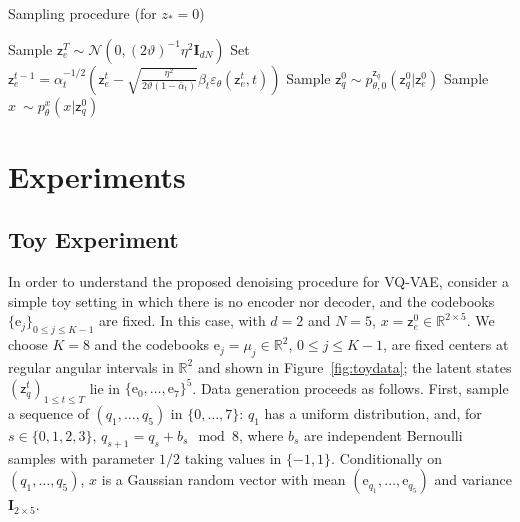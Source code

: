 \documentclass[nohyperref]{article}
\theoremstyle{plain}
\theoremstyle{definition}
\theoremstyle{remark}
\newcommand{\rset}{\mathbb{R}}
\newcommand{\latentcont}{\mathsf{z}_e}
\newcommand{\latentdis}{\mathsf{z}_q}
\newcommand{\rme}{\mathrm{e}}
\newcommand{\embed}{\rme}
\begin{document}
\begin{algorithm}[tb]
   \caption{Sampling procedure (for $z_* = 0$)}
   \label{alg:sample}
\begin{algorithmic}
   
   \STATE Sample $\latentcont^T \sim \mathcal{N}(0, (2\vartheta)^{-1}\eta^2 \mathbf{I}_{dN})$ 
   \STATE Set $\latentcont^{t-1} = \alpha_t^{-1/2}\left(\latentcont^t - \sqrt{\frac{\eta^2}{2\vartheta (1-\bar{\alpha}_t)}}\beta_t\varepsilon_\theta(\latentcont^{t},t)\right)$
   \ENDFOR
   \STATE  Sample $\latentdis^0 \sim  p^{\latentdis}_{\theta,0}(\latentdis^0|\latentcont^0)$ 
   \STATE Sample $x ~ \sim  p^x_{\theta}(x|\latentdis^0)$ 
\end{algorithmic}
\end{algorithm}


\section{Experiments}

\subsection{Toy Experiment}
In order to understand the proposed denoising procedure for VQ-VAE, consider a simple toy setting in which there is no encoder nor decoder, and the codebooks $\{\embed_j\}_{0\leqslant j \leqslant K-1}$ are fixed. In this case, with $d=2$ and $N=5$, $x = \latentcont^0 \in \rset^{2\times 5}$. We choose $K=8$ and the codebooks $\embed_j = \mu_j \in \rset^2$, $0\leqslant j \leqslant K-1$, are fixed centers at regular angular intervals in $\rset^2$ and shown in Figure~\ref{fig:toydata}; the latent states $(\latentdis^t)_{1\leq t\leq T}$ lie in $\{\embed_0,\ldots,\embed_7\}^5$. Data generation proceeds as follows. First, sample a sequence of $(q_1,\ldots,q_5)$ in $\{0,\dots,7\}$: $q_1$ has a uniform distribution, and, for $s\in\{0,1,2,3\}$, $q_{s+1} = q_s + b_s \mod 8$, where $b_s$ are independent Bernoulli samples with parameter $1/2$ taking values in $\{-1, 1\}$. Conditionally on $(q_1,\ldots,q_5)$, $x$ is a Gaussian random vector with mean $(\embed_{q_1},\ldots,\embed_{q_5})$ and variance $\mathbf{I}_{2\times 5}$. 

\end{document}
